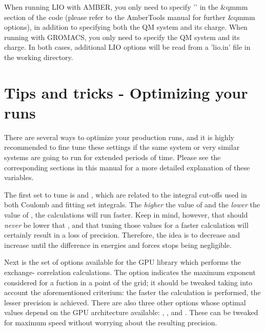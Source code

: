 When running LIO with AMBER, you only need to specify ''
in the \&qmmm section of the code (please refer to the AmberTools manual for further 
\&qmmm options), in addition to specifying both the QM system and its charge. 
When running with GROMACS, you only need to specify the QM system and its charge.
In both cases, additional LIO options will be read from a '\textcolor{liopurple}{lio.in}'
file in the working directory.

\section{Tips and tricks - Optimizing your runs}
There are several ways to optimize your production runs, and it is highly recommended
to fine tune these settings if the same system or very similar systems are going to
run for extended periods of time. Please see the corresponding sections in this manual
for a more detailed explanation of these variables.

The first set to tune is  and , which are
related to the integral cut-offs used in both Coulomb and fitting set integrals. The
\textit{higher} the value of  and the \textit{lower} the value
of , the calculations will run faster. Keep in mind, however,
that  should \textit{never} be lower that ,
and that tuning those values for a faster calculation will certainly result in a loss
of precision. Therefore, the idea is to decrease   and increase
 until the difference in energies and forces stops being
negligible.

Next is the set of options available for the GPU library which performs the exchange-
correlation calculations. The option  indicates
the maximum exponent considered for a fuction in a point of the grid; it should be 
tweaked taking into account the aforementioned criterium: the faster the calculation
is performed, the lesser precision is achieved. 
There are also three other options whose optimal values depend on the GPU architecture
available: , ,
and . These can be tweaked for maximum speed without
worrying about the resulting precision.


